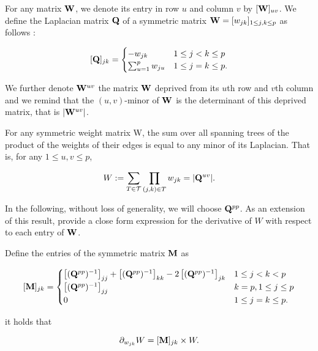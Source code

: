 For any matrix ${\bf W}$, we denote its entry in row $u$ and column $v$ by $[{\bf W}]_{uv}$. We define the Laplacian matrix ${\bf Q}$ of a symmetric matrix ${\bf W}=[w_{jk} ]_{1\leq j,k\leq p}$ as follows :
\begin{linenomath*}
\[
 [{\bf Q}]_{jk} =\begin{cases}
    -w_{jk}  & 1\leq j<k \leq p\\
    \sum_{u=1}^p w_{ju} & 1\leq j=k \leq p.
    \end{cases}
\]
\end{linenomath*}
We further denote ${\bf W}^{uv}$ the matrix ${\bf W}$ deprived from its $u$th row and $v$th column and we remind that the $(u, v)$-minor of ${\bf W}$ is the determinant of this deprived matrix, that is $|{\bf W}^{uv}|$.

\begin{theorem} \label{thm:MTT}
    For any symmetric weight matrix W, the sum over all spanning trees of the product of the weights of their edges is equal to any minor of its Laplacian. That is, for any $1 \leq u, v \leq p$,
   \begin{linenomath*}
   \[
    W := \sum_{T\in\mathcal{T}} \prod_{(j, k)\in T} w_{jk}  = |{\bf Q}^{uv}|.
    \]
    \end{linenomath*}
\end{theorem}    

In the following, without loss of generality, we will choose ${\bf Q}^{pp}$. As an extension of this result, \cite{MeilaJaak} provide a close form expression for the derivative of $W$ with respect to each entry of ${\bf W}$. 

\begin{lemma}  \label{lem:Meila}
    Define the entries of the symmetric matrix ${\bf M}$ as
\begin{linenomath*}
\[    
 [{\bf M}]_{jk} =\begin{cases}
    \left[({\bf Q}^{pp})^{-1}\right]_{jj} + \left[({\bf Q}^{pp})^{-1}\right]_{kk} -2\left[({\bf Q}^{pp})^{-1}\right]_{jk} & 1\leq j<k < p\\
    \left[({\bf Q}^{pp})^{-1}\right]_{jj} & k=p, 1\leq j \leq p  \\
    0 & 1\leq j=k \leq p.
    \end{cases}
\]
\end{linenomath*}
it holds that
\begin{linenomath*}
$$
\partial_{w_{jk}} W = [{\bf M}]_{jk}  \times W.
$$
\end{linenomath*}
\end{lemma}
